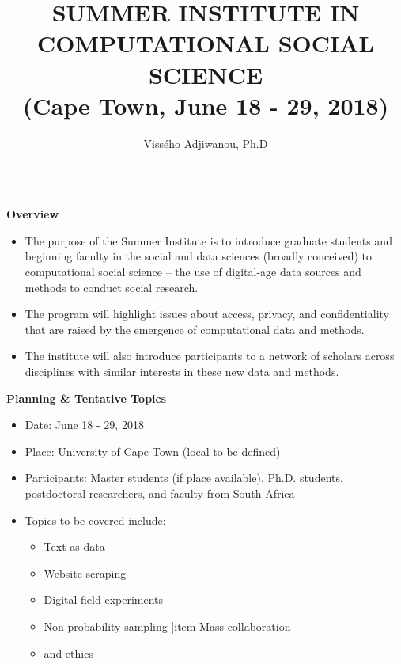 \documentclass{beamer}
\author[cssforafrica@gmail.com / https://compsocialscience.github.io/summer-institute/2018/capetown/]{Vissého Adjiwanou, Ph.D}
\title{SUMMER INSTITUTE IN COMPUTATIONAL SOCIAL SCIENCE\\(Cape Town, June 18 - 29, 2018)}
\institute{University of Cape Town}
\begin{document}
\begin{frame}[fragile]
\begin{columns}[T]

\begin{column}{.48\textwidth}

\begin{block}{\textbf{Overview}}
\begin{itemize}
\item The purpose of the Summer Institute is to introduce graduate students and beginning faculty in the social and data sciences (broadly conceived) to computational social science – the use of digital-age data sources and methods to conduct social
research.
\item The program will highlight issues about access, privacy, and confidentiality that are raised by the emergence
of computational data and methods. 
\item The institute will also introduce participants to a network of scholars across disciplines with similar interests in these new data and methods.
\end{itemize}
\end{block}

\begin{block}{\textbf{Planning \& Tentative Topics}}
\begin{itemize}
\item Date: June 18 - 29, 2018
\item Place: University of Cape Town (local to be defined)
\item Participants: Master students (if place available), Ph.D. students, postdoctoral researchers, and faculty from South Africa
\item Topics to be covered include:
	\begin{itemize}
	\item Text as data
    \item Website scraping
    \item Digital field experiments
    \item Non-probability sampling
    |item Mass collaboration
    \item and ethics
	\end{itemize}  
\end{itemize}
\end{block}


\end{column}
\end{columns}
\end{frame}
\end{document}
